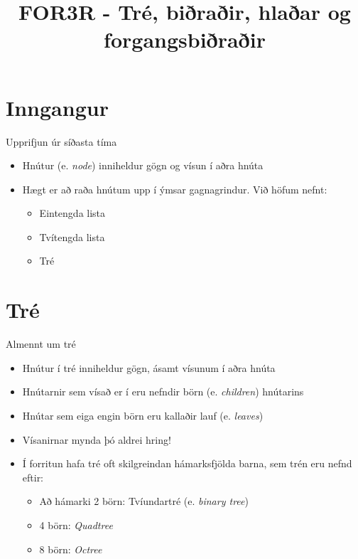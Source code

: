 \documentclass{beamer}
\title{FOR3R - Tré, biðraðir, hlaðar og forgangsbiðraðir}
\begin{document}
\begin{frame}
\titlepage
\end{frame}

\section{Inngangur}

\begin{frame}{Upprifjun úr síðasta tíma}
\begin{itemize}
 \item Hnútur (e. \emph{node}) inniheldur gögn og vísun í aðra hnúta
 \item Hægt er að raða hnútum upp í ýmsar gagnagrindur. Við höfum nefnt:
 \begin{itemize}
  \item Eintengda lista
  \item Tvítengda lista
  \item Tré
 \end{itemize}
\end{itemize}
\end{frame}

\section{Tré}

\begin{frame}{Almennt um tré}
\begin{itemize}
 \item Hnútur í tré inniheldur gögn, ásamt vísunum í aðra hnúta
 \item Hnútarnir sem vísað er í eru nefndir börn (e. \emph{children}) hnútarins
 \item Hnútar sem eiga engin börn eru kallaðir lauf (e. \emph{leaves})
 \item Vísanirnar mynda þó aldrei hring!
 \item Í forritun hafa tré oft skilgreindan hámarksfjölda barna, sem trén eru nefnd eftir:
  \begin{itemize}
   \item Að hámarki 2 börn: Tvíundartré (e. \emph{binary tree})
   \item 4 börn: \emph{Quadtree}
   \item 8 börn: \emph{Octree}
  \end{itemize}
\end{itemize}
\end{frame}
\end{document}

